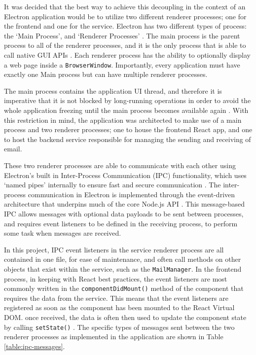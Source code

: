 It was decided that the best way to achieve this decoupling in the context of an Electron application would be to utilize two different renderer processes; one for the frontend and one for the service. Electron has two different types of process: the `Main Process', and `Renderer Processes' \cite{electron-architecture}. The main process is the parent process to all of the renderer processes, and it is the only process that is able to call native GUI APIs \cite{electron-architecture}. Each renderer process has the ability to optionally display a web page inside a \verb|BrowserWindow|. Importantly, every application must have exactly one Main process but can have multiple renderer processes.

The main process contains the application UI thread, and therefore it is imperative that it is not blocked by long-running operations in order to avoid the whole application freezing until the main process becomes available again \cite{electron-performance}. With this restriction in mind, the application was architected to make use of a main process and two renderer processes; one to house the frontend React app, and one to host the backend service responsible for managing the sending and receiving of email.

These two renderer processes are able to communicate with each other using Electron's built in Inter-Process Communication (IPC) functionality, which uses `named pipes' internally to ensure fast and secure communication \cite{chromium-ipc}. The inter-process communication in Electron is implemented through the event-driven architecture that underpins much of the core Node.js API \cite{node-events}. This message-based IPC allows messages with optional data payloads to be sent between processes, and requires event listeners to be defined in the receiving process, to perform some task when messages are received.

In this project, IPC event listeners in the service renderer process are all contained in one file, for ease of maintenance, and often call methods on other objects that exist within the service, such as the \verb|MailManager|. In the frontend process, in keeping with React best practices, the event listeners are most commonly written in the \verb|componentDidMount()| method \cite{react-components} of the component that requires the data from the service. This means that the event listeners are registered as soon as the component has been mounted to the React Virtual DOM. once received, the data is often then used to update the component state by calling \verb|setState()| \cite{react-state}. The specific types of messages sent between the two renderer processes as implemented in the application are shown in Table \ref{table:ipc-messages}.

